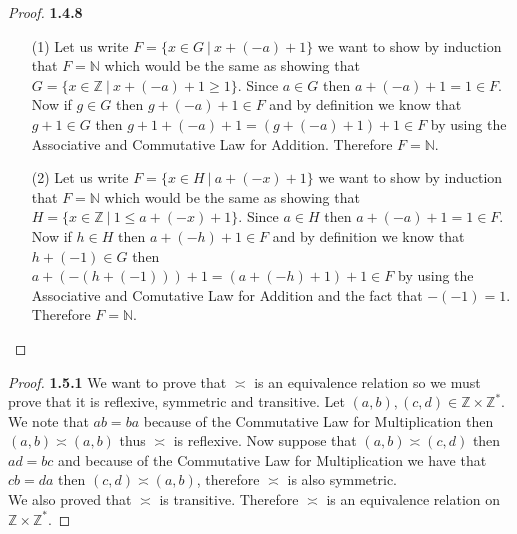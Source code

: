 \documentclass[11pt]{article}
\newcommand{\N}{\mathbb{N}}
\newcommand{\Z}{\mathbb{Z}}
\theoremstyle{definition}
\begin{document}
    \begin{proof}{\textbf{1.4.8}}
        \begin{itemize}
        \item [(1)]
        Let us write $F = \{x\in G ~|~ x+(-a)+1\}$ we want to show by induction that
        $F = \N$ which would be the same as showing that
        $G = \{x\in \Z ~|~ x+(-a)+1 \geq 1\}$. Since $a\in G$ then $a+(-a)+1=1 \in F$.
        Now if $g \in G$ then $g+(-a)+1 \in F$ and by definition we know that $g+1 \in G$
        then $g+1+(-a)+1 = (g+(-a)+1)+1 \in F$ by using the Associative and Commutative
        Law for Addition. Therefore $F=\N$.
        \item [(2)]
        Let us write $F = \{x\in H ~|~ a+(-x)+1\}$ we want to show by induction that
        $F = \N$ which would be the same as showing that
        $H = \{x\in \Z ~|~ 1 \leq a+(-x)+1\}$. Since $a \in H$ then $a+(-a)+1=1 \in F$.
        Now if $h \in H$ then $a+ (-h)+1 \in F$ and by definition we know that
        $h+(-1) \in G$ then $a+(-(h+(-1)))+1 = (a+(-h)+1)+1 \in F$ by using the
        Associative and Comutative Law for Addition and the fact that $-(-1) = 1$.
        Therefore $F = \N$.
        \end{itemize}
    \end{proof}
    \begin{proof}{\textbf{1.5.1}}
        We want to prove that $\asymp$ is an equivalence relation so we must prove that
        it is reflexive, symmetric and transitive. Let $(a,b),(c,d) \in \Z \times \Z^*$.
        We note that $ab=ba$ because of the Commutative Law for Multiplication then
        $(a,b)\asymp(a,b)$ thus $\asymp$ is reflexive. Now suppose that $(a,b)\asymp(c,d)$
        then $ad=bc$ and because of the Commutative Law for Multiplication we have that
        $cb=da$ then $(c,d)\asymp(a,b)$, therefore $\asymp$ is also symmetric.\\
        We also proved that $\asymp$ is transitive. Therefore $\asymp$ is an equivalence
        relation on $\Z \times \Z^*$. 
    \end{proof}
\cleardoublepage
\end{document}
